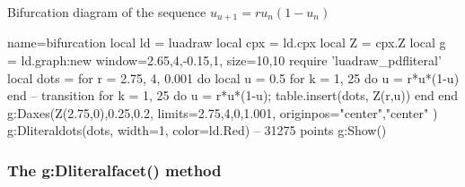 \begin{demo}{Bifurcation diagram of the sequence $u_{u+1}=ru_n(1-u_n)$}
\begin{luadraw}{name=bifurcation}
local ld = luadraw
local cpx = ld.cpx
local Z = cpx.Z
local g = ld.graph:new{ window={2.65,4,-0.15,1}, size={10,10} }
require 'luadraw_pdfliteral'
local dots = {}
for r = 2.75, 4, 0.001 do
    local u = 0.5
    for k = 1, 25 do u = r*u*(1-u) end -- transition
    for k = 1, 25 do u = r*u*(1-u); table.insert(dots, Z(r,u)) end
end
g:Daxes({Z(2.75,0),0.25,0.2}, {limits={{2.75,4},{0,1.001}}, originpos={"center","center"} })
g:Dliteraldots(dots, {width=1, color=ld.Red}) -- 31275 points
g:Show()
\end{luadraw}
\end{demo}

\subsubsection{The g:Dliteralfacet() method}

